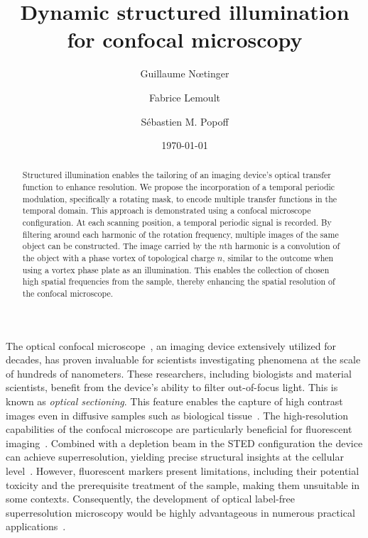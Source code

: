 \documentclass[%
reprint,
 amsmath,amssymb,
 aps,
]{revtex4-2}
\begin{document}
\title{Dynamic structured illumination for confocal microscopy}%

\author{Guillaume N\oe{}tinger}
\author{Fabrice Lemoult}%
\author{Sébastien M. Popoff}%
%

\date{\today}%

\begin{abstract}
Structured illumination enables the tailoring of an imaging device's optical transfer function to enhance resolution. We propose the incorporation of a temporal periodic modulation, specifically a rotating mask, to encode multiple transfer functions in the temporal domain. This approach is demonstrated using a confocal microscope configuration. At each scanning position, a temporal periodic signal is recorded. By filtering around each harmonic of the rotation frequency, multiple images of the same object can be constructed.
The image carried by the $n{\mathrm{th}}$ harmonic is a convolution of the object with a phase vortex of topological charge $n$, similar to the outcome when using a vortex phase plate as an illumination. This enables the  collection of chosen high spatial frequencies from the sample, thereby enhancing the spatial resolution of the confocal microscope.
\end{abstract}

\maketitle

The optical confocal microscope~\cite{PatentMinsky}, an imaging device extensively utilized for decades, has proven invaluable for scientists investigating phenomena at the scale of hundreds of nanometers. These researchers, including biologists and material scientists, benefit from the device's ability to filter out-of-focus light. This is known as \textit{optical sectioning}. This feature enables the capture of high contrast images even in diffusive samples such as biological tissue~\cite{CorleKino}.  The high-resolution capabilities of the confocal microscope are particularly beneficial for fluorescent imaging~\cite{jonkman_tutorial_2020}. Combined with a depletion beam in the STED %
configuration the device can achieve superresolution, yielding precise structural insights at the cellular level~\cite{STED}. However, fluorescent markers present %
limitations, including their potential toxicity and the prerequisite treatment of the sample, making them unsuitable in some contexts. Consequently, the development %
of optical label-free superresolution microscopy would be highly advantageous in numerous practical applications~\cite{FreeImaging, LabelFreeSuperBook}.
\end{document}
